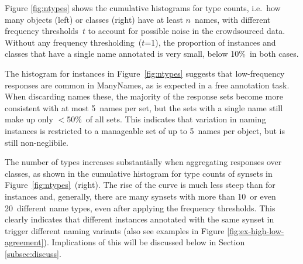 Figure \ref{fig:ntypes} shows the cumulative histograms for type counts, i.e.\ how many objects (left) or classes (right) have at least $n$\ names, with different frequency thresholds~$t$ to account for possible noise in the crowdsourced data.
Without any frequency thresholding~\mbox{($t$=1)}, the proportion of instances and classes that have a single name annotated is very small, below 10\%\ in both cases. 

The histogram for instances in Figure\ \ref{fig:ntypes} suggests that low-frequency responses are common in ManyNames, as is expected in a free annotation task.
When discarding names these, the %
majority of the response sets become more consistent with at most 5\ names per set, 
but the sets with a single name still make up only $<$50\%\ of all sets. 
This indicates that variation in naming instances is restricted to a manageable set of up to 5\ names per object, but is still non-neglibile.

The number of types increases substantially when aggregating responses over classes, as shown in the cumulative histogram for type counts of synsets in Figure\ \ref{fig:ntypes}\ (right).
The rise of the curve is much less steep than for instances and, generally, there are many synsets with more than 10\ or even 20\ different name types, even after applying the frequency thresholds. This clearly indicates that different instances annotated with the same 
synset in \vg trigger different naming variants (also see examples in Figure \ref{fig:ex-high-low-agreement}). 
Implications of this will be discussed below in Section \ref{subsec:discuss}.



